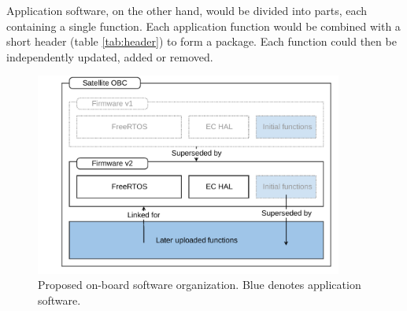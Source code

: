 Application software, on the other hand, would be divided into parts, each containing a single function. Each application function would be combined with a short header (table \ref{tab:header}) to form a package. Each function could then be independently updated, added or removed.

\begin{figure}[t]
	\centering
	\includegraphics[width=0.9\textwidth]{figures/On-board_software_organisation.pdf}
	\caption{Proposed on-board software organization. Blue denotes application software.}
	\label{fig:swOrg}
\end{figure}

